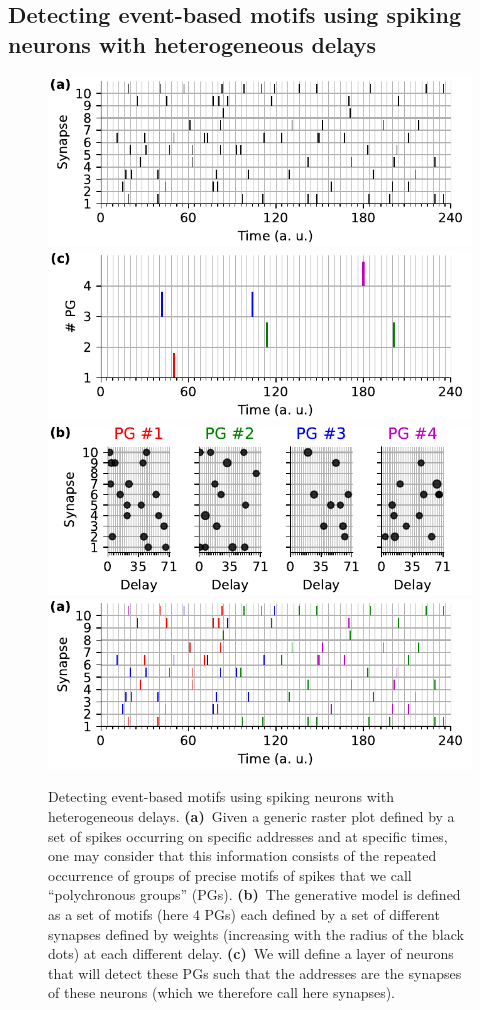 \documentclass[default]{sn-jnl}%
\theoremstyle{thmstyleone}%
\theoremstyle{thmstyletwo}%
\theoremstyle{thmstylethree}%
\begin{document}
\subsection{Detecting event-based motifs using spiking neurons with heterogeneous delays}%
%
\begin{figure}[t!]
    \centering
    \includegraphics[width=0.490\linewidth]{figures/figure_1a_k.pdf}
    \includegraphics[width=0.490\linewidth]{figures/figure_1c.pdf}
    \includegraphics[width=0.490\linewidth]{figures/figure_1b.pdf}
    \includegraphics[width=0.490\linewidth]{figures/figure_1a.pdf}
	    \caption{Detecting event-based motifs using spiking neurons with heterogeneous delays. 
	    {\bf (a)}~Given a generic raster plot defined by a set of spikes occurring on specific addresses and at specific times, one may consider that this information consists of the repeated occurrence of groups of precise motifs of spikes that we call ``polychronous groups'' (PGs). 
	    {\bf (b)}~The generative model is defined as a set of motifs (here $4$ PGs) each defined by a set of different synapses defined by weights (increasing with the radius of the black dots) at each different delay. 
	    {\bf (c)}~We will define a layer of neurons that will detect these PGs such that the addresses are the synapses of these neurons (which we therefore call here synapses).
}
\end{figure}
\end{document}
